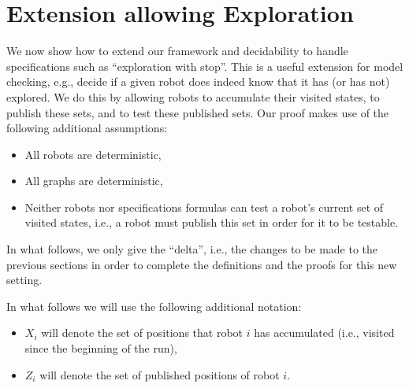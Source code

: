 \section{Extension allowing Exploration} \label{sec:extensions}

%
%
%
%


We now show how to extend our framework and decidability to handle specifications such as ``exploration with stop''. This is a useful extension for model checking, e.g., decide if a given robot does indeed know that it has (or has not) explored.  We do this by allowing robots to accumulate their visited states, to publish these sets, and to test these published sets.  Our proof makes use of the following additional assumptions:
\begin{itemize}
 \item All robots are deterministic,
 \item All graphs are deterministic,
 \item Neither robots nor specifications formulas can test a robot's current set of visited states, i.e., a robot must publish this set in order for it to be testable.
\end{itemize}

In what follows, we only give the ``delta'', i.e., the changes to be made to the previous sections in order to complete the definitions and the proofs for this new setting.

In what follows we will use the following additional notation:
\begin{itemize}
 \item $X_i$ will denote the set of positions that robot $i$ has accumulated (i.e., visited since the beginning of the run),
 \item $Z_i$ will denote the set of published positions of robot $i$.
\end{itemize}


